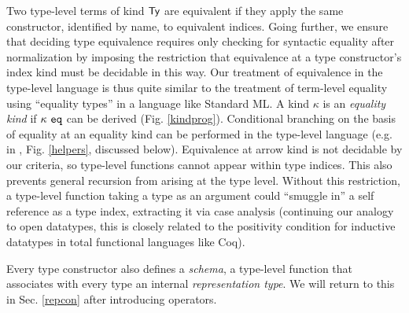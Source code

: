 \documentclass[9pt,preprint]{sigplanconf}
\begin{document}
Two type-level terms of kind $\textsf{Ty}$ are equivalent if they apply the same constructor, identified by name, to equivalent indices. Going further, we ensure that deciding type equivalence requires only checking for syntactic equality after normalization by imposing the restriction that equivalence at a type constructor's index kind must be decidable in this way. Our treatment of equivalence in the type-level language is thus quite similar to the treatment of term-level equality using ``equality types'' in a language like Standard ML. A kind $\kappa$ is an  \emph{equality kind} if $\kappa~\mathtt{eq}$ can be derived (Fig. \ref{kindprog}). Conditional branching on the basis of equality at an equality kind can be performed in the type-level language (e.g. in , Fig. \ref{helpers}, discussed below). Equivalence at arrow kind is not decidable by our criteria, so type-level functions cannot appear within type indices. This also prevents general recursion from arising at the type level. Without this restriction, a type-level function taking a type as an argument could ``smuggle in'' a self reference as a type index, extracting it via case analysis (continuing our analogy to open datatypes, this is closely related to the positivity condition for inductive datatypes in total functional languages like Coq).%

Every type constructor also defines a \emph{schema}, a type-level function that associates with every type an internal \emph{representation type}. We will return to this in Sec. \ref{repcon} after introducing operators. 
\end{document}
